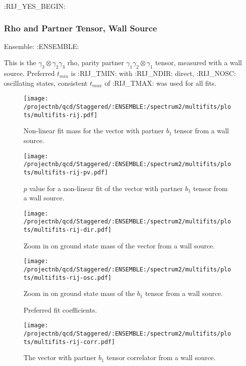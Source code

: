 \clearpage

:RIJ_YES_BEGIN:
\subsubsection{Rho and Partner Tensor, Wall Source}

Ensemble: :ENSEMBLE:

This is the $\gamma_3 \otimes \gamma_2 \gamma_3$ rho, parity partner $\gamma_1 \gamma_2 \otimes \gamma_1$ tensor, measured with a wall source. Preferred $t_{min}$ is :RIJ_TMIN: with :RIJ_NDIR: direct, :RIJ_NOSC: oscillating states, consistent $t_{max}$ of :RIJ_TMAX: was used for all fits.


\begin{multicols}{2}
\begin{figure}[H]
\centering
\texttt{[image: /projectnb/qcd/Staggered/:ENSEMBLE:/spectrum2/multifits/plots/multifits-rij.pdf]}
\caption{Non-linear fit mass for the vector with partner $b_1$ tensor from a wall source.}
\end{figure}
\columnbreak
\begin{figure}[H]
\centering
\texttt{[image: /projectnb/qcd/Staggered/:ENSEMBLE:/spectrum2/multifits/plots/multifits-rij-pv.pdf]}
\caption{$p$ value for a non-linear fit of the vector with partner $b_1$ tensor from a wall source.}
\end{figure}
\end{multicols}

\begin{multicols}{2}
\begin{figure}[H]
\centering
\texttt{[image: /projectnb/qcd/Staggered/:ENSEMBLE:/spectrum2/multifits/plots/multifits-rij-dir.pdf]}
\caption{Zoom in on ground state mass of the vector from a wall source.}
\end{figure}
\columnbreak
\begin{figure}[H]
\centering
\texttt{[image: /projectnb/qcd/Staggered/:ENSEMBLE:/spectrum2/multifits/plots/multifits-rij-osc.pdf]}
\caption{Zoom in on ground state mass of the $b_1$ tensor from a wall source.}
\end{figure}
\end{multicols}

\begin{multicols}{2}
\begin{figure}[H]
\centering
\scriptsize

\caption{Preferred fit coefficients.}
\end{figure}
\columnbreak
\begin{figure}[H]
\centering
\texttt{[image: /projectnb/qcd/Staggered/:ENSEMBLE:/spectrum2/multifits/plots/multifits-rij-corr.pdf]}
\caption{The vector with partner $b_1$ tensor correlator from a wall source.}
\end{figure}
\end{multicols}

